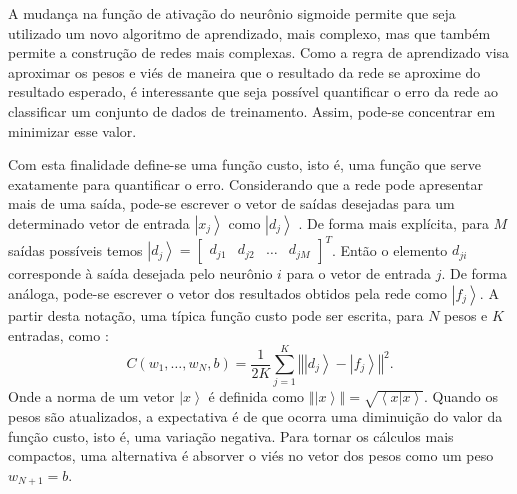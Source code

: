 A mudança na função de ativação do neurônio sigmoide permite que seja utilizado um novo algoritmo de aprendizado, mais complexo, mas que também permite a construção de redes mais complexas. Como a regra de aprendizado visa aproximar os pesos e viés de maneira que o resultado da rede se aproxime do resultado esperado, é interessante que seja possível quantificar o erro da rede ao classificar um conjunto de dados de treinamento. Assim, pode-se concentrar em minimizar esse valor.

Com esta finalidade define-se uma função custo, isto é, uma função que serve exatamente para quantificar  o erro. Considerando que a rede pode apresentar mais de uma saída, pode-se escrever o vetor de saídas desejadas para um determinado vetor de entrada $\left|x_j\right\rangle $ como $\left|d_j\right\rangle $ . De forma mais explícita, para $M$ saídas possíveis temos  $ \left|d_{j}\right\rangle =\left[\begin{array}{cccc}
d_{j1} & d_{j2} & \dots & d_{jM}\end{array}\right]^{T} $. Então o elemento $d_{ji}$  corresponde à saída desejada pelo neurônio $i$ para o vetor de entrada $j$. De forma análoga, pode-se escrever o vetor dos resultados obtidos pela rede como $\left|f_{j}\right\rangle $. A partir desta notação, uma típica função custo pode ser escrita, para $N$ pesos e $K$  entradas, como \cite{nielsen2015neural}:
\begin{equation}C\left(w_{1},\dots,w_{N},b\right)=\frac{1}{2K}\sum_{j=1}^{K}\left\Vert \left|d_{j}\right\rangle -\left|f_{j}\right\rangle \right\Vert ^{2} . \end{equation}
Onde a norma de um vetor $\left|x\right\rangle $  é definida como $\left\Vert \left|x\right\rangle \right\Vert =\sqrt{\left\langle x|x\right\rangle }$. Quando os pesos são atualizados, a expectativa é de que ocorra uma diminuição do valor da função custo, isto é, uma variação negativa. Para tornar os cálculos mais compactos, uma alternativa é absorver o viés no vetor dos pesos como um peso $w_{N+1}=b$. 
